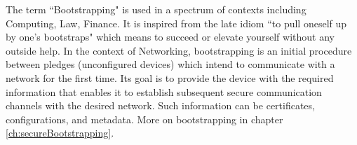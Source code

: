 The term ``Bootstrapping" is used in a spectrum of contexts including Computing, Law, Finance. It is inspired from the late idiom ``to pull oneself up by one's bootstraps" which means to succeed or elevate yourself without any outside help. In the context of Networking, bootstrapping is an initial procedure between pledges (unconfigured devices) which intend to communicate with a network for the first time. Its goal is to provide the device with the required information that enables it to establish subsequent secure communication channels with the desired network. Such information can be certificates, configurations, and metadata. More on bootstrapping in chapter \ref{ch:secureBootstrapping}.
